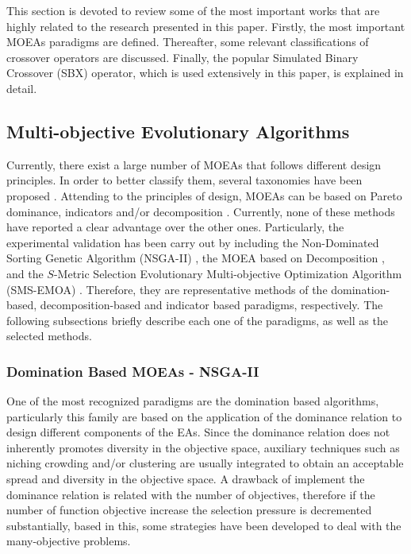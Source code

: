 
This section is devoted to review some of the most important works that are highly related to the research presented in this paper.
%
Firstly, the most important MOEAs paradigms are defined.
%
Thereafter, some relevant classifications of crossover operators are discussed.
%
Finally, the popular Simulated Binary Crossover (SBX) operator, which is used extensively in this paper, is explained in detail.

\subsection{Multi-objective Evolutionary Algorithms}
Currently, there exist a large number of MOEAs that follows different design principles.
%
In order to better classify them, several taxonomies have been proposed \cite{Joel:BOOK_MOEAs}.
%
Attending to the principles of design, MOEAs can be based on Pareto dominance, indicators and/or decomposition \cite{pilat2010evolutionary}.
%
Currently, none of these methods have reported a clear advantage over the other ones.
%
Particularly, the experimental validation has been carry out by including the Non-Dominated Sorting Genetic Algorithm (NSGA-II) \cite{Joel:NSGAII}, the MOEA based on Decomposition \cite{Joel:MOEAD}, and the $S$-Metric Selection Evolutionary Multi-objective Optimization Algorithm (SMS-EMOA) \cite{Joel:SMSEMOA}.
%
Therefore, they are representative methods of the domination-based, decomposition-based and indicator based paradigms, respectively.
%
The following subsections briefly describe each one of the paradigms, as well as the selected methods.

\subsubsection{Domination Based MOEAs - NSGA-II}

One of the most recognized paradigms are the domination based algorithms, particularly this family are based on the application of the dominance relation to design different components of the EAs.
%
Since the dominance relation does not inherently promotes diversity in the objective space, auxiliary techniques such as niching crowding and/or clustering are usually integrated to obtain an acceptable spread and diversity in the objective space.
%
A drawback of implement the dominance relation is related with the number of objectives, therefore if the number of function objective increase the selection pressure is decremented substantially, based in this, some strategies have been developed to deal with the many-objective problems.

